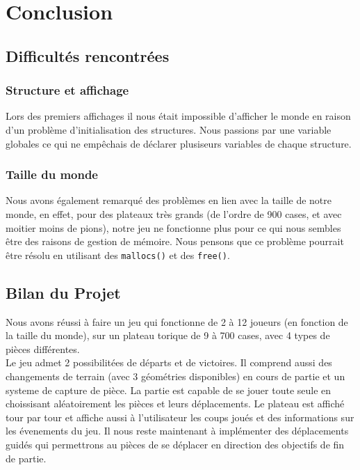 \chapter{Conclusion}

\section{Difficultés rencontrées}
    \subsection{Structure et affichage}
        Lors des premiers affichages il nous était impossible d'afficher le monde en raison d'un problème d'initialisation des structures. Nous passions par une variable globales ce qui ne empêchais de déclarer plusiseurs variables de chaque structure.\\
    \subsection{Taille du monde}
        Nous avons également remarqué des problèmes en lien avec la taille de notre monde, en effet, pour des plateaux très grands (de l'ordre de 900 cases, et avec moitier moins de pions), notre jeu ne fonctionne plus pour ce qui nous sembles être des raisons de gestion de mémoire. Nous pensons que ce problème pourrait être résolu en utilisant des \texttt{mallocs()} et des \texttt{free()}. 
\section{Bilan du Projet}
    Nous avons réussi à faire un jeu qui fonctionne de 2 à 12 joueurs (en fonction de la taille du monde), sur un plateau torique de 9 à 700 cases, avec 4 types de pièces différentes.\\
    Le jeu admet 2 possibilitées de départs et de victoires. Il comprend aussi des changements de terrain (avec 3 géométries disponibles) en cours de partie et un systeme de capture de pièce. La partie est capable de se jouer toute seule en choissisant aléatoirement les pièces et leurs déplacements. Le plateau est affiché tour par tour et affiche aussi à l'utilisateur les coups joués et des informations sur les évenements du jeu.
    \medbreak
    \noindent Il nous reste maintenant à implémenter des déplacements guidés qui permettrons au pièces de se déplacer en direction des objectifs de fin de partie.
